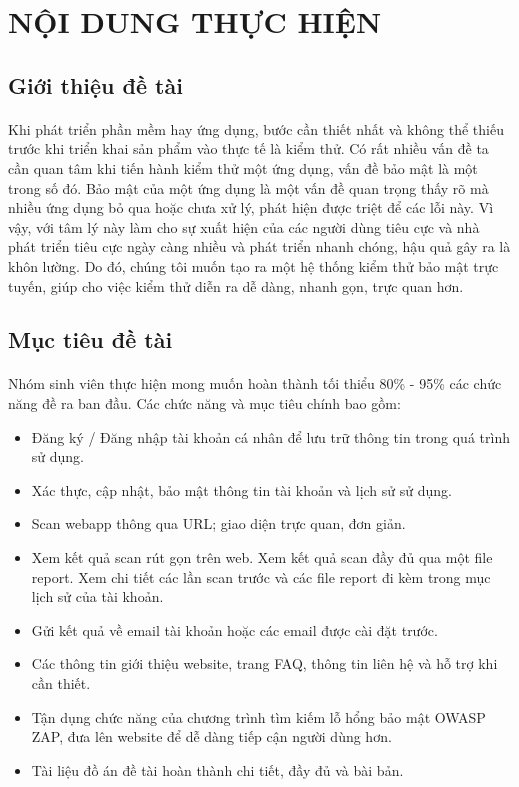 \newpage

\section{NỘI DUNG THỰC HIỆN}

\subsection{Giới thiệu đề tài}
\paragraph{}
Khi phát triển phần mềm hay ứng dụng, bước cần thiết nhất và không thể thiếu 
trước khi triển khai sản phẩm vào thực tế là kiểm thử. Có rất nhiều vấn đề ta cần 
quan tâm khi tiến hành kiểm thử một ứng dụng, vấn đề bảo mật là một trong số đó. Bảo mật 
của một ứng dụng là một vấn đề quan trọng thấy rõ mà nhiều ứng dụng bỏ qua hoặc chưa xử lý, phát hiện
được triệt để các lỗi này. Vì vậy, với tâm lý này làm cho sự xuất hiện của các người dùng tiêu cực và 
nhà phát triển tiêu cực ngày càng nhiều và phát triển nhanh chóng, hậu quả gây ra là khôn lường.
Do đó, chúng tôi muốn tạo ra một hệ thống kiểm thử bảo mật trực tuyến, giúp cho việc kiểm thử diễn ra dễ dàng, 
nhanh gọn, trực quan hơn.

\subsection{Mục tiêu đề tài}
\paragraph{}
Nhóm sinh viên thực hiện mong muốn hoàn thành tối thiểu 80\% - 95\% các chức năng đề ra ban đầu. Các chức năng và mục tiêu chính bao gồm:
\begin{itemize}
    \item Đăng ký / Đăng nhập tài khoản cá nhân để lưu trữ thông tin trong quá trình sử dụng.
    \item Xác thực, cập nhật, bảo mật thông tin tài khoản và lịch sử sử dụng.
    \item Scan webapp thông qua URL; giao diện trực quan, đơn giản.
    \item Xem kết quả scan rút gọn trên web. Xem kết quả scan đầy đủ qua một file report. Xem chi tiết các lần scan trước và các file report đi kèm trong mục lịch sử của tài khoản.
    \item Gửi kết quả về email tài khoản hoặc các email được cài đặt trước.
    \item Các thông tin giới thiệu website, trang FAQ, thông tin liên hệ và hỗ trợ khi cần thiết.
    \item Tận dụng chức năng của chương trình tìm kiếm lỗ hổng bảo mật OWASP ZAP, đưa lên website để dễ dàng tiếp cận người dùng hơn.
    \item Tài liệu đồ án đề tài hoàn thành chi tiết, đầy đủ và bài bản.
\end{itemize} 


